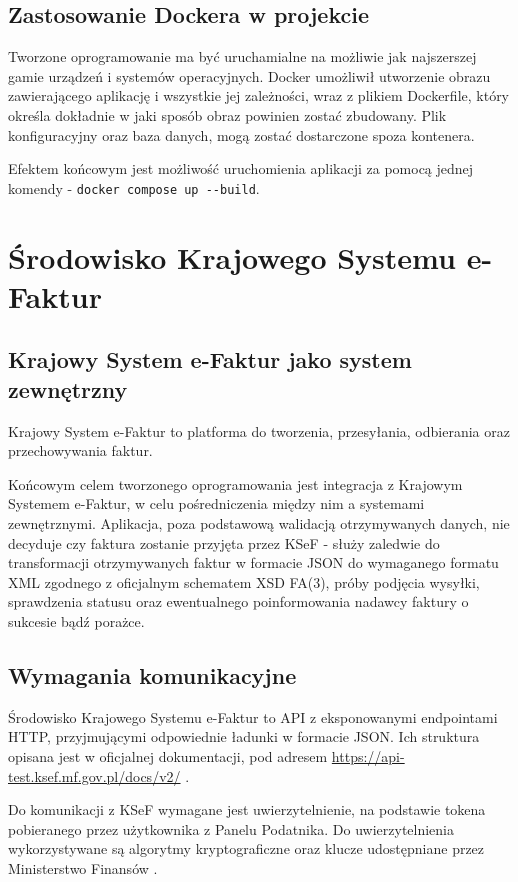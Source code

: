 \subsection{Zastosowanie Dockera w projekcie}
Tworzone oprogramowanie ma być uruchamialne na możliwie jak najszerszej gamie urządzeń i systemów operacyjnych. Docker umożliwił utworzenie obrazu zawierającego aplikację i wszystkie jej zależności, wraz z plikiem Dockerfile, który określa dokładnie w jaki sposób obraz powinien zostać zbudowany. Plik konfiguracyjny oraz baza danych, mogą zostać dostarczone spoza kontenera.

Efektem końcowym jest możliwość uruchomienia aplikacji za pomocą jednej komendy - \texttt{docker compose up -{}-build}.

\section{Środowisko Krajowego Systemu e-Faktur}
\subsection{Krajowy System e-Faktur jako system zewnętrzny}
Krajowy System e-Faktur to platforma do tworzenia, przesyłania, odbierania oraz przechowywania faktur.

Końcowym celem tworzonego oprogramowania jest integracja z Krajowym Systemem e-Faktur, w celu pośredniczenia między nim a systemami zewnętrznymi. Aplikacja, poza podstawową walidacją otrzymywanych danych, nie decyduje czy faktura zostanie przyjęta przez KSeF - służy zaledwie do transformacji otrzymywanych faktur w formacie JSON do wymaganego formatu XML zgodnego z oficjalnym schematem XSD FA(3), próby podjęcia wysyłki, sprawdzenia statusu oraz ewentualnego poinformowania nadawcy faktury o sukcesie bądź porażce.  

\subsection{Wymagania komunikacyjne}
Środowisko Krajowego Systemu e-Faktur to API z eksponowanymi endpointami HTTP, przyjmującymi odpowiednie ładunki w formacie JSON. Ich struktura opisana jest w oficjalnej dokumentacji, pod adresem \url{https://api-test.ksef.mf.gov.pl/docs/v2/} \parencite{ksef_api_docs}. 

Do komunikacji z KSeF wymagane jest uwierzytelnienie, na podstawie tokena pobieranego przez użytkownika z Panelu Podatnika. Do uwierzytelnienia wykorzystywane są algorytmy kryptograficzne oraz klucze udostępniane przez Ministerstwo Finansów \parencite{ksef_api_docs}.

